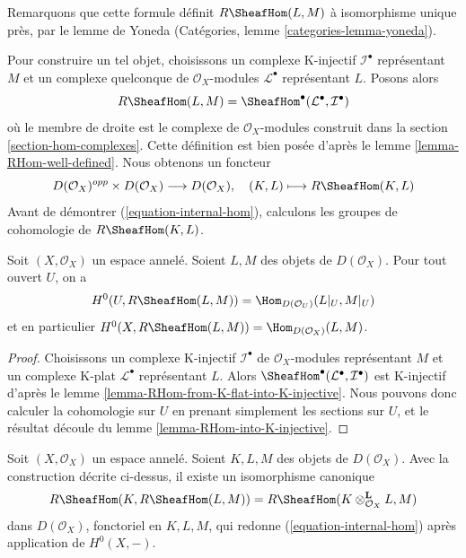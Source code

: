 Remarquons que cette formule définit $R\SheafHom(L, M)$ à isomorphisme unique près, par le lemme de Yoneda (Catégories, lemme \ref{categories-lemma-yoneda}).

\medskip\noindent
Pour construire un tel objet, choisissons un complexe K-injectif $\mathcal{I}^\bullet$ représentant $M$ et un complexe quelconque de $\mathcal{O}_X$-modules $\mathcal{L}^\bullet$ représentant $L$. Posons alors $$
R\SheafHom(L, M) = \SheafHom^\bullet(\mathcal{L}^\bullet, \mathcal{I}^\bullet)
$$ où le membre de droite est le complexe de $\mathcal{O}_X$-modules construit dans la section \ref{section-hom-complexes}. Cette définition est bien posée d'après le lemme \ref{lemma-RHom-well-defined}. Nous obtenons un foncteur $$
D(\mathcal{O}_X)^{opp} \times D(\mathcal{O}_X) \longrightarrow D(\mathcal{O}_X),
\quad
(K, L) \longmapsto R\SheafHom(K, L)
$$ Avant de démontrer (\ref{equation-internal-hom}), calculons les groupes de cohomologie de $R\SheafHom(K, L)$.

\begin{lemma}

\label{lemma-section-RHom-over-U}
Soit $(X, \mathcal{O}_X)$ un espace annelé. Soient $L, M$ des objets de $D(\mathcal{O}_X)$. Pour tout ouvert $U$, on a $$
H^0(U, R\SheafHom(L, M)) =
\Hom_{D(\mathcal{O}_U)}(L|_U, M|_U)
$$ et en particulier $H^0(X, R\SheafHom(L, M)) = \Hom_{D(\mathcal{O}_X)}(L, M)$.
\end{lemma}

\begin{proof}
Choisissons un complexe K-injectif $\mathcal{I}^\bullet$ de $\mathcal{O}_X$-modules représentant $M$ et un complexe K-plat $\mathcal{L}^\bullet$ représentant $L$. Alors $\SheafHom^\bullet(\mathcal{L}^\bullet, \mathcal{I}^\bullet)$ est K-injectif d'après le lemme \ref{lemma-RHom-from-K-flat-into-K-injective}. Nous pouvons donc calculer la cohomologie sur $U$ en prenant simplement les sections sur $U$, et le résultat découle du lemme \ref{lemma-RHom-into-K-injective}.
\end{proof}

\begin{lemma}

\label{lemma-internal-hom}
Soit $(X, \mathcal{O}_X)$ un espace annelé. Soient $K, L, M$ des objets de $D(\mathcal{O}_X)$. Avec la construction décrite ci-dessus, il existe un isomorphisme canonique $$
R\SheafHom(K, R\SheafHom(L, M)) =
R\SheafHom(K \otimes_{\mathcal{O}_X}^\mathbf{L} L, M)
$$ dans $D(\mathcal{O}_X)$, fonctoriel en $K, L, M$, qui redonne (\ref{equation-internal-hom}) après application de $H^0(X, -)$.
\end{lemma}

